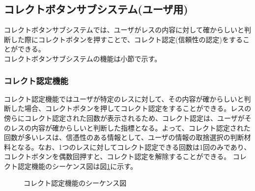 \documentclass[a4j]{jarticle}
\begin{document}
  \subsection{コレクトボタンサブシステム(ユーザ用)}
  コレクトボタンサブシステムでは、ユーザがレスの内容に対して確からしいと判断した際にコレクトボタンを押すことで、コレクト認定(信頼性の認定)をすることができる。\\
  コレクトボタンサブシステムの機能は小節で示す。
  \subsubsection{コレクト認定機能}
  コレクト認定機能ではユーザが特定のレスに対して、その内容が確からしいと判断した場合、コレクトボタンを押してコレクト認定をすることができる。レスの傍らにコレクト認定された回数が表示されるため、コレクト認定は、ユーザがそのレスの内容が確からしいと判断した指標となる。よって、コレクト認定された回数が多いレスは、信憑性のある情報として、ユーザの情報の取捨選択の判断材料となる。なお、1つのレスに対してコレクト認定できる回数は1回のみであり、コレクトボタンを偶数回押すと、コレクト認定を解除することができる。
  コレクト認定機能のシーケンス図は図\ref{fig:correct_correct.png}に示す。

  \begin{figure}[H]
    \centering
    \caption{コレクト認定機能のシーケンス図}
    \label{fig:correct_correct.png}
  \end{figure}
\end{document}
